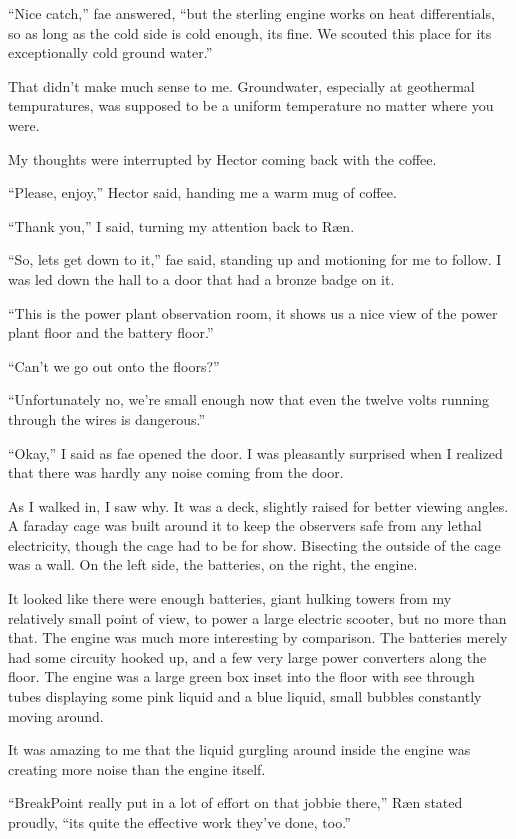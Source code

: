 ``Nice catch,'' fae answered, ``but the sterling engine works on heat differentials, so as long as the cold side is cold enough, its fine.  We scouted this place for its exceptionally cold ground water.''

That didn't make much sense to me.  Groundwater, especially at geothermal tempuratures, was supposed to be a uniform temperature no matter where you were.

My thoughts were interrupted by Hector coming back with the coffee.

``Please, enjoy,'' Hector said, handing me a warm mug of coffee.

``Thank you,'' I said, turning my attention back to Ræn.

``So, lets get down to it,'' fae said, standing up and motioning for me to follow.  I was led down the hall to a door that had a bronze badge on it.

``This is the power plant observation room, it shows us a nice view of the power plant floor and the battery floor.''

``Can't we go out onto the floors?''

``Unfortunately no, we're small enough now that even the twelve volts running through the wires is dangerous.''

``Okay,'' I said as fae opened the door.  I was pleasantly surprised when I realized that there was hardly any noise coming from the door.

As I walked in, I saw why.  It was a deck, slightly raised for better viewing angles.  A faraday cage was built around it to keep the observers safe from any lethal electricity, though the cage had to be for show.  Bisecting the outside of the cage was a wall.  On the left side, the batteries, on the right, the engine.

It looked like there were enough batteries, giant hulking towers from my relatively small point of view, to power a large electric scooter, but no more than that.  The engine was much more interesting by comparison.  The batteries merely had some circuity hooked up, and a few very large power converters along the floor.  The engine was a large green box inset into the floor with see through tubes displaying some pink liquid and a blue liquid, small bubbles constantly moving around.

It was amazing to me that the liquid gurgling around inside the engine was creating more noise than the engine itself.

``BreakPoint really put in a lot of effort on that jobbie there,'' Ræn stated proudly, ``its quite the effective work they've done, too.''

